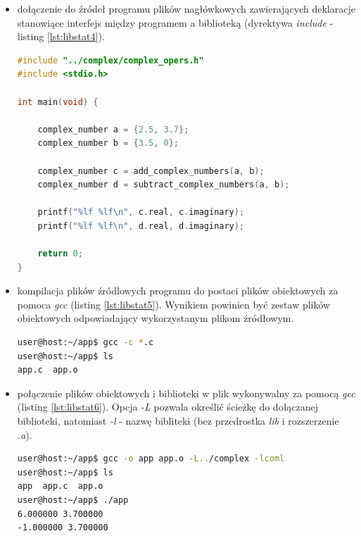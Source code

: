\begin{itemize}
\item dołączenie do źródeł programu plików nagłówkowych zawierających deklaracje stanowiące interfejs między programem a biblioteką (dyrektywa \textit{include} - listing \ref{lst:libstat4}).

\begin{lstlisting}[language=c++, caption={Plik \textit{app.c} zawierający dyrektywę \textit{include} dołączającą plik nagłówkowy zawierający deklaracje funkcji z biblioteki statycznej},label={lst:libstat4}]
#include "../complex/complex_opers.h"
#include <stdio.h>

int main(void) {

    complex_number a = {2.5, 3.7};
    complex_number b = {3.5, 0};

    complex_number c = add_complex_numbers(a, b);
    complex_number d = subtract_complex_numbers(a, b);

    printf("%lf %lf\n", c.real, c.imaginary);
    printf("%lf %lf\n", d.real, d.imaginary);

    return 0;
}
\end{lstlisting}

\item kompilacja plików źródlowych programu do postaci plików obiektowych za pomoca \textit{gcc} (listing \ref{lst:libstat5}). Wynikiem powinien być zestaw plików obiektowych odpowiadający wykorzystanym plikom źródłowym.

\begin{lstlisting}[language=bash, caption={Kompilacja plików źródłowych głównego programu do postaci obiektowej.},label={lst:libstat5}]
user@host:~/app$ gcc -c *.c
user@host:~/app$ ls
app.c  app.o
\end{lstlisting}


\item połączenie plików obiektowych i biblioteki w plik wykonywalny za pomocą \textit{gcc} (listing \ref{lst:libstat6}). Opcja \textit{-L} pozwala określić ścieżkę do dołączanej biblioteki, natomiast \textit{-l} - nazwę bibliteki (bez przedrostka \textit{lib} i rozszerzenie \textit{.a}).

\begin{lstlisting}[language=bash, caption={Linkowanie plików obiektowych programu z biblioteką statyczną, wynik uruchomienia programu obrazuący poprawne działanie przykładu.},label={lst:libstat6}]
user@host:~/app$ gcc -o app app.o -L../complex -lcoml
user@host:~/app$ ls
app  app.c  app.o
user@host:~/app$ ./app
6.000000 3.700000
-1.000000 3.700000
\end{lstlisting}

\end{itemize}

